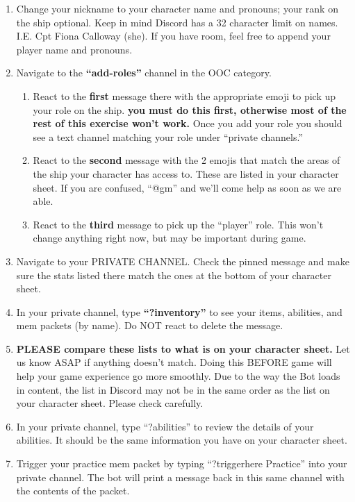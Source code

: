 \documentclass[green]{TMFHope}
\begin{document}
\begin{enumerate}
  \item Change your nickname to your character name and pronouns; your rank on the ship optional. Keep in mind Discord has a 32 character limit on names. I.E. Cpt Fiona Calloway (she). If you have room, feel free to append your player name and pronouns.
  \item Navigate to the \textbf{``add-roles''} channel in the OOC category.
	\begin{enumerate}
  \item React to the \textbf{first} message there with the appropriate emoji to pick up your role on the ship. \textbf{you must do this first, otherwise most of the rest of this exercise won't work.} Once you add your role you should see a text channel matching your role under ``private channels.''
	\item React to the \textbf{second} message with the 2 emojis that match the areas of the ship your character has access to. These are listed in your character sheet. If you are confused, ``@gm'' and we'll come help as soon as we are able.
	\item React to the \textbf{third} message to pick up the ``player'' role. This won't change anything right now, but may be important during game.
  \end{enumerate}
	\item Navigate to your PRIVATE CHANNEL. Check the pinned message and make sure the stats listed there match the ones at the bottom of your character sheet.
	\item In your private channel, type \textbf{``?inventory''} to see your items, abilities, and mem packets (by name). Do NOT react to delete the message.
	\item \textbf{PLEASE compare these lists to what is on your character sheet.} Let us know ASAP if anything doesn't match. Doing this BEFORE game will help your game experience go more smoothly. Due to the way the Bot loads in content, the list in Discord may not be in the same order as the list on your character sheet. Please check carefully.
	\item In your private channel, type ``?abilities'' to review the details of your abilities. It should be the same information you have on your character sheet.
  \item Trigger your practice mem packet by typing ``?triggerhere Practice'' into your private channel. The bot will print a message back in this same channel with the contents of the packet.

\end{enumerate}
\end{document}
